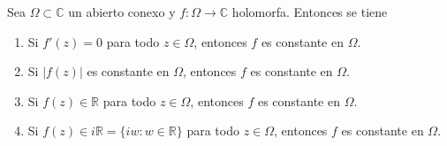 \begin{proposición}
    Sea $\Omega \subset \mathbb{C}$ un abierto conexo y $f : \Omega \to \mathbb{C}$ holomorfa. Entonces se tiene
    \begin{enumerate}
        \item Si $f'(z) = 0$ para todo $z \in \Omega$, entonces $f$ es constante en $\Omega$.
        \item Si $|f(z)|$ es constante en $\Omega$, entonces $f$ es constante en $\Omega$.
        \item Si $f(z) \in \mathbb{R}$ para todo $z \in \Omega$, entonces $f$ es constante en $\Omega$.
        \item Si $f(z) \in i \mathbb{R} = \{iw : w \in \mathbb{R}\}$ para todo $z \in \Omega$, entonces $f$ es constante en $\Omega$.
    \end{enumerate} \label{prop:constantes_holomorfas}
\end{proposición}

